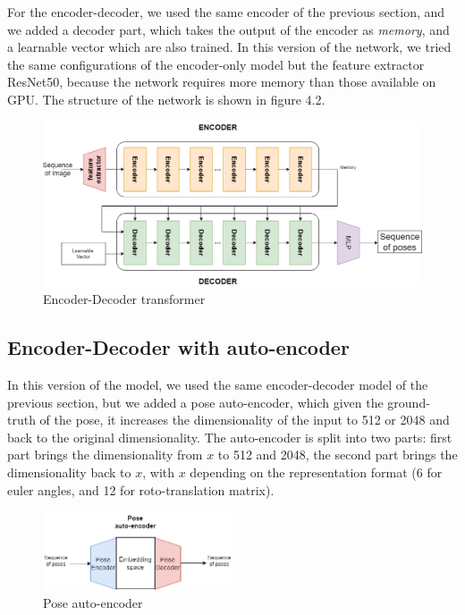 For the encoder-decoder, we used the same encoder of the previous section, and we added a decoder part, which takes the output of the encoder as \textit{memory}, and a learnable vector which are also trained.
In this version of the network, we tried the same configurations of the encoder-only model but the feature extractor ResNet50, because the network requires more memory than those available on GPU.
The structure of the network is shown in figure 4.2.
\begin{figure}[H]
    \centering
    \includegraphics[width=\textwidth]{images/4_1_encoder_decoder}
    \caption{Encoder-Decoder transformer}\label{fig:figure-encoder-decoder-transformer}
\end{figure}

\subsection{Encoder-Decoder with auto-encoder}\label{subsec:encoder-decoder-with-auto-encoder}
In this version of the model, we used the same encoder-decoder model of the previous section, but we added a pose auto-encoder, which given the ground-truth of the pose, it increases the dimensionality of the input to 512 or 2048 and back to the original dimensionality.
The auto-encoder is split into two parts: first part brings the dimensionality from $x$ to 512 and 2048, the second part brings the dimensionality back to $x$, with $x$ depending on the representation format (6 for euler angles, and 12 for roto-translation matrix).
\begin{figure}[H]
    \centering
    \includegraphics[width=0.5\textwidth]{images/4_1_pose_encoder}
    \caption{Pose auto-encoder}\label{fig:figure-pose-encoder}
\end{figure}

